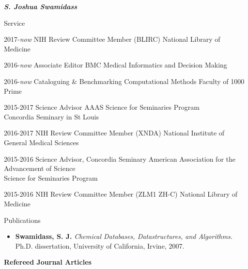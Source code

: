 \documentclass[10pt]{article}
\begin{document}
\begin{cv}{\huge \it \bfseries S. Joshua Swamidass}
\begin{cvlist}{Service}
\item[2017-\emph{now}] NIH Review Committee Member  (BLIRC) \hfill National Library of Medicine
\item[2016-\emph{now}] Associate Editor \hfill BMC Medical Informatics and Decision Making
\item[2016-\emph{now}] Cataloguing \& Benchmarking Computational Methods \hfill Faculty of 1000 Prime
\item[2015-2017] Science Advisor \hfill AAAS Science for Seminaries Program\\  \hspace*{\fill} Concordia Seminary in St Louis
\item[2016-2017] NIH Review Committee Member  (XNDA) \hfill National Institute of General Medical Sciences
\item[2015-2016] Science Advisor, Concordia Seminary \hfill  American Association for the Advancement of Science \\  \hspace*{\fill} Science for Seminaries Program
\item[2015-2016] NIH Review Committee Member (ZLM1 ZH-C) \hfill National Library of Medicine 
\end{cvlist}


\renewenvironment{thebibliography}[1]{
\setlength{\topsep}{0em}
\setlength{\labelsep}{.5em}
\begin{etaremune}{
\setlength{\itemsep}{0.5em}}
}{\end{etaremune}}
\renewcommand{\bibitem}[1]{\item}

\setlength{\cvlabelsep}{0mm}
\setlength{\cvlabelwidth}{0mm}
\renewcommand{\labelitemi}{}

\begin{cvlist}{Publications}
\item {\begin{itemize}\item{\bf Swamidass, S. J.} \emph{Chemical Databases, Datastructures, and Algorithms.} Ph.D. dissertation, University of California, Irvine, 2007. \end{itemize}}
\item {\bf Refereed Journal Articles}


\end{cvlist}
\end{cv}
\end{document}
